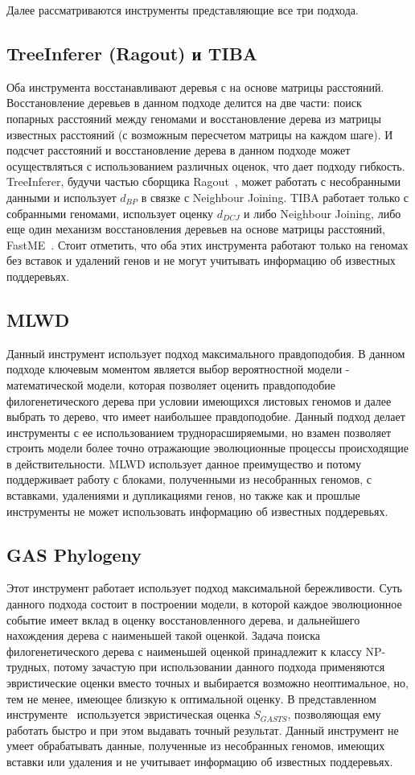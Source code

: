 Далее рассматриваются инструменты представляющие все три подхода.

\subsection{TreeInferer (Ragout) и TIBA}
Оба инструмента восстанавливают деревья с на основе матрицы расстояний.
Восстановление деревьев в данном подходе делится на две части:
поиск попарных расстояний между геномами и восстановление дерева из матрицы известных расстояний
(с возможным пересчетом матрицы на каждом шаге).
И подсчет расстояний и восстановление дерева в данном подходе может осуществляться с использованием различных оценок, что дает подходу гибкость.
TreeInferer, будучи частью сборщика Ragout~\cite{Kolmogorov2014}, может работать с несобранными данными
и использует $d_{BP}$ в связке с Neighbour Joining.
TIBA работает только с собранными геномами, использует оценку $d_{DCJ}$
и либо Neighbour Joining, либо еще один механизм восстановления деревьев на основе матрицы расстояний, FastME~\cite{desper2002fast}.
Стоит отметить, что оба этих инструмента работают только на геномах без вставок и удалений генов
и не могут учитывать информацию об известных поддеревьях.

\subsection{MLWD}
Данный инструмент использует подход максимального правдоподобия.
В данном подходе ключевым моментом является выбор вероятностной модели - математической модели,
которая позволяет оценить правдоподобие филогенетического дерева при условии имеющихся листовых геномов
и далее выбрать то дерево, что имеет наибольшее правдоподобие.
Данный подход делает инструменты с ее использованием труднорасширяемыми,
но взамен позволяет строить модели более точно отражающие эволюционные процессы происходящие в действительности.
MLWD использует данное преимущество и потому поддерживает работу с блоками, полученными из несобранных геномов,
с вставками, удалениями и дупликациями генов, но также как
и прошлые инструменты не может использовать информацию об известных поддеревьях.

\subsection{GAS Phylogeny}
Этот инструмент работает использует подход максимальной бережливости.
Суть данного подхода состоит в построении модели,
в которой каждое эволюционное событие имеет вклад в оценку восстановленного дерева, и дальнейшего нахождения дерева с наименьшей такой оценкой.
Задача поиска филогенетического дерева с наименьшей оценкой принадлежит к классу NP-трудных, потому зачастую при использовании данного подхода
применяются эвристические оценки вместо точных и выбирается возможно неоптимальное, но, тем не менее, имеющее близкую к оптимальной оценку.
В представленном инструменте~\cite{xu2011gasts} используется эвристическая оценка $S_{GASTS}$, позволяющая ему работать быстро и при этом выдавать точный результат.
Данный инструмент не умеет обрабатывать данные, полученные из несобранных геномов, имеющих вставки или удаления и не учитывает информацию об
известных поддеревьях.

